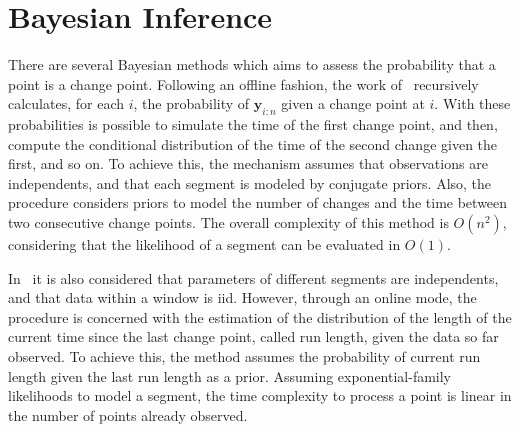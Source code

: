 \section{Bayesian Inference}

There are several Bayesian methods which aims to assess the probability that a point is a change point. Following an offline fashion, the work of~\cite{exact_and_efficient_bayesian_inference_for_multiple_changepoint_problems} recursively calculates, for each $i$, the probability of $\mathbf{y}_{i : n}$ given a change point at $i$. With these probabilities is possible to simulate the time of the first change point, and then, compute the conditional distribution of the time of the second change given the first, and so on. To achieve this, the mechanism assumes that observations are independents, and that each segment is modeled by conjugate priors. Also, the procedure considers priors to model the number of changes and the time between two consecutive change points. The overall complexity of this method is $O(n^{2})$, considering that the likelihood of a segment can be evaluated in $O(1)$.

In~\cite{bayesian_online_changepoint_detection} it is also considered that parameters of different segments are independents, and that data within a window is iid. However, through an online mode, the procedure is concerned with the estimation of the distribution of the length of the current time since the last change point, called run length, given the data so far observed. To achieve this, the method assumes the probability of current run length given the last run length as a prior. Assuming exponential-family likelihoods to model a segment, the time complexity to process a point is linear in the number of points already observed. 
